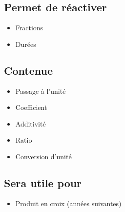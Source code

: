 \subsection{Permet de réactiver}
\begin{itemize}
    \item Fractions
    \item Durées
\end{itemize}

\subsection{Contenue}
\begin{itemize}
    \item Passage à l'unité
    \item Coefficient
    \item Additivité
    \item Ratio
    \item Conversion d'unité
\end{itemize}

\subsection{Sera utile pour}
\begin{itemize}
    \item Produit en croix (années suivantes)
\end{itemize}